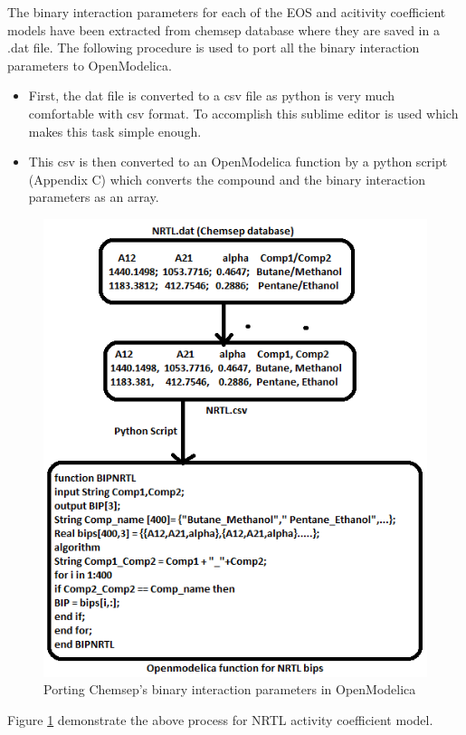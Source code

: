 \documentclass[12pt]{report}
\begin{document}
The binary interaction parameters for each of the EOS and acitivity coefficient models have been extracted from chemsep database where they are saved in a .dat file. The following procedure is used to port all the binary interaction parameters to OpenModelica. 

\begin{itemize}
\item First, the dat file is converted to a csv file as python is very much comfortable with csv format. To accomplish this sublime editor is used which makes this task simple enough.
\item This csv is then converted to an OpenModelica function by a python script (Appendix C) which converts the compound and the binary interaction parameters as an array.
\end{itemize}

\begin{figure}
\centering
\includegraphics[width=0.8\linewidth]{BT3}
\caption{Porting Chemsep's binary interaction parameters in OpenModelica}
\label{fig:BT3}
\end{figure}

Figure \ref{fig:BT3} demonstrate the above process for NRTL activity coefficient model.
\end{document}
